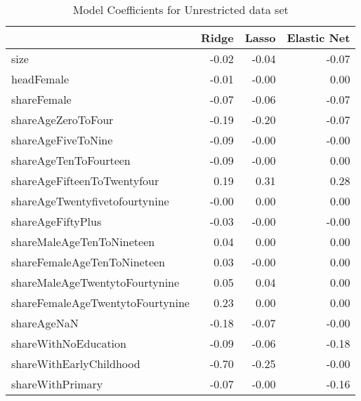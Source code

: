 \begin{longtable}{lrrr}

\caption{Model Coefficients for Unrestricted data set}
\label{table:MergedUnrestrict}
\\\hline
{} &  Ridge  &  Lasso  &  Elastic Net  \\
\hline
\endhead

\hline
\endfoot
size &               -0.02 &               -0.04 &                     -0.07 \\
headFemale &               -0.01 &               -0.00 &                      0.00 \\
shareFemale &               -0.07 &               -0.06 &                     -0.07 \\
shareAgeZeroToFour &               -0.19 &               -0.20 &                     -0.07 \\
shareAgeFiveToNine &               -0.09 &               -0.00 &                     -0.00 \\
shareAgeTenToFourteen &               -0.09 &               -0.00 &                      0.00 \\
shareAgeFifteenToTwentyfour &                0.19 &                0.31 &                      0.28 \\
shareAgeTwentyfivetofourtynine &               -0.00 &                0.00 &                      0.00 \\
shareAgeFiftyPlus &               -0.03 &               -0.00 &                     -0.00 \\
shareMaleAgeTenToNineteen &                0.04 &                0.00 &                      0.00 \\
shareFemaleAgeTenToNineteen &                0.03 &               -0.00 &                      0.00 \\
shareMaleAgeTwentytoFourtynine &                0.05 &                0.04 &                      0.00 \\
shareFemaleAgeTwentytoFourtynine &                0.23 &                0.00 &                      0.00 \\
shareAgeNaN &               -0.18 &               -0.07 &                     -0.00 \\
shareWithNoEducation &               -0.09 &               -0.06 &                     -0.18 \\
shareWithEarlyChildhood &               -0.70 &               -0.25 &                     -0.00 \\
shareWithPrimary &               -0.07 &               -0.00 &                     -0.16 \\

\end{longtable}
